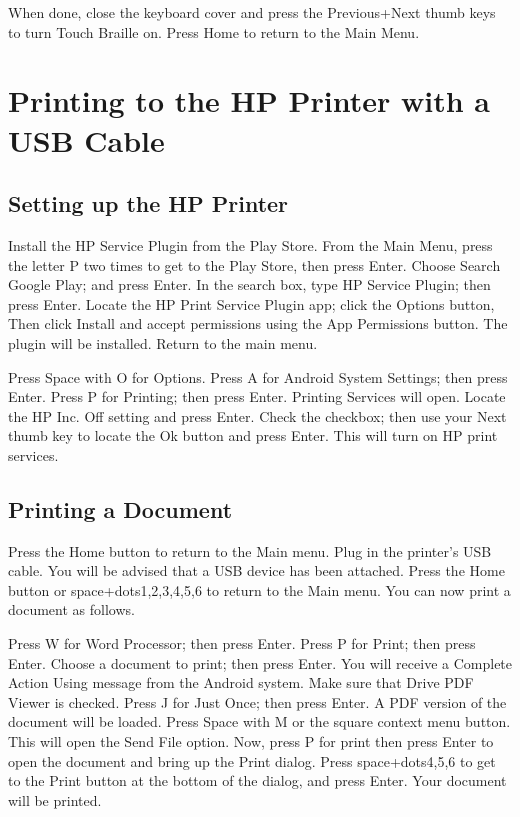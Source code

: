 \documentclass[10pt,letterpaper,twoside]{report}
\begin{document}
{{{When done, close the keyboard cover and press the Previous+Next thumb keys to turn Touch Braille on.
Press Home to return to the Main Menu.

\section{Printing to the HP Printer with a USB Cable}

\subsection{Setting up the HP Printer}

Install the HP Service Plugin from the Play Store. 
From the Main Menu, press the letter P two times to get to the Play Store, then press Enter. 
Choose Search Google Play; and press Enter. 
In the search box, type HP Service Plugin; then press Enter. 
Locate the HP Print Service Plugin app; click the Options button, Then click Install and accept permissions using the App Permissions button. The plugin will be installed. 
Return to the main menu. 

Press Space with O for Options. 
Press A for Android System Settings; then press Enter. 
Press P for Printing; then press Enter. Printing Services will open. 
Locate the HP Inc. Off setting and press Enter. 
Check the checkbox; then use your Next thumb key to locate the Ok button and press Enter. This will turn on HP print services. 

\subsection{Printing a Document}

Press the Home button to return to the Main menu. 
Plug in the printer's USB cable. You will be advised that a USB device has been attached. Press the Home button or space+dots1,2,3,4,5,6 to return to the Main menu. You can now print a document as follows. 

Press W for Word Processor; then press Enter. 
Press P for Print; then press Enter. 
Choose a document to print; then press Enter. You will receive a Complete Action Using message from the Android system. 
Make sure that Drive PDF Viewer is checked. 
Press J for Just Once; then press Enter. A PDF version of the document will be loaded. 
Press Space with M or the square context menu button. This will open the Send File option. 
Now, press P for print then press Enter to open the document and bring up the Print dialog. 
Press space+dots4,5,6 to get to the Print button at the bottom of the dialog, and press Enter. Your document will be printed. 

}}}
\end{document}
